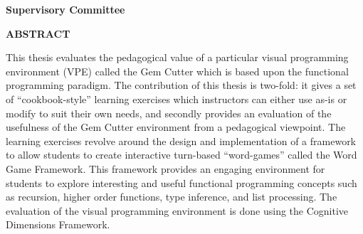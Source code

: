 \newpage
{}

\noindent \textbf{Supervisory Committee}
\tpbreak
\panel

\begin{center}
\textbf{ABSTRACT}
\end{center}

This thesis evaluates the pedagogical value of a particular visual programming environment (VPE) called the Gem Cutter which is based upon the functional programming paradigm.  The contribution of this thesis is two-fold: it gives a set of ``cookbook-style'' learning exercises which instructors can either use as-is or modify to suit their own needs, and secondly provides an evaluation of the usefulness of the Gem Cutter environment from a pedagogical viewpoint.  The learning exercises revolve around the design and implementation of a framework to allow students to create interactive turn-based ``word-games'' called the Word Game Framework. This framework provides an engaging environment for students to explore interesting and useful functional programming concepts such as recursion, higher order functions, type inference, and list processing.  The evaluation of the visual programming environment is done using the Cognitive Dimensions Framework.